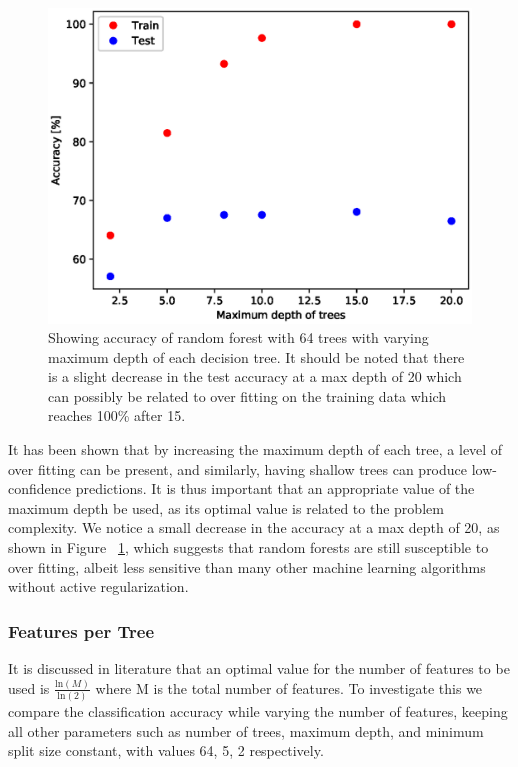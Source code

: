 \documentclass{article} %
\begin{document}
\begin{figure}[ht]
\begin{center}
\includegraphics[scale=0.4]{max_depth}
\end{center}
\caption{Showing accuracy of random forest with 64 trees with varying maximum depth of each decision tree. It should be noted that there is a slight decrease in the test accuracy at a max depth of 20 which can possibly be related to over fitting on the training data which reaches 100\% after 15.}
\label{fig:max_depth}
\end{figure}

It has been shown that by increasing the maximum depth of each tree, a level of over fitting can be present, and similarly, having shallow trees can produce low-confidence predictions. \cite{Criminisi2011} It is thus important that an appropriate value of the maximum depth be used, as its optimal value is related to the problem complexity. We notice a small decrease in the accuracy at a max depth of 20, as shown in Figure ~\ref{fig:max_depth}, which suggests that random forests are still susceptible to over fitting, albeit less sensitive than many other machine learning algorithms without active regularization.

\subsubsection{Features per Tree}

It is discussed in literature that an optimal value for the number of features to be used is $\frac{\text{ln}(M)}{\text{ln}(2)}$ where M is the total number of features. \cite{Brieman01} To investigate this we compare the classification accuracy while varying the number of features, keeping all other parameters such as number of trees, maximum depth, and minimum split size constant, with values 64, 5, 2 respectively.
\end{document}
